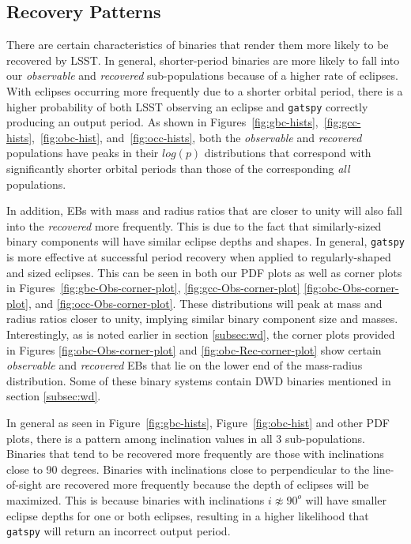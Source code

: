 \documentclass[twocolumn]{aastex63}
\begin{document}
\subsection{Recovery Patterns}
\label{subsec:recovery-patterns}
There are certain characteristics of binaries that render them more likely to be recovered by LSST. In general, shorter-period binaries are more likely to fall into our \textit{observable} and \textit{recovered} sub-populations because of a higher rate of eclipses. With eclipses occurring more frequently due to a shorter orbital period, there is a higher probability of both LSST observing an eclipse and \texttt{gatspy} correctly producing an output period. As shown in Figures~\ref{fig:gbc-hists},~\ref{fig:gcc-hists},~\ref{fig:obc-hist}, and~\ref{fig:occ-hists}, both the \textit{observable} and \textit{recovered} populations have peaks in their $log(p)$ distributions that correspond with significantly shorter orbital periods than those of the corresponding \textit{all} populations.

In addition, EBs with mass and radius ratios that are closer to unity will also fall into the \textit{recovered} more frequently. This is due to the fact that similarly-sized binary components will have similar eclipse depths and shapes. In general, \texttt{gatspy} is more effective at successful period recovery when applied to regularly-shaped and sized eclipses. This can be seen in both our PDF plots as well as corner plots in Figures~\ref{fig:gbc-Obs-corner-plot}, \ref{fig:gcc-Obs-corner-plot} \ref{fig:obc-Obs-corner-plot}, and \ref{fig:occ-Obs-corner-plot}. These distributions will peak at mass and radius ratios closer to unity, implying similar binary component size and masses. Interestingly, as is noted earlier in section \ref{subsec:wd}, the corner plots provided in Figures \ref{fig:obc-Obs-corner-plot} and \ref{fig:obc-Rec-corner-plot} show certain \textit{observable} and \textit{recovered} EBs that lie on the lower end of the mass-radius distribution. Some of these binary systems contain DWD binaries mentioned in section \ref{subsec:wd}.

In general as seen in Figure~\ref{fig:gbc-hists}, Figure~\ref{fig:obc-hist} and other PDF plots, there is a pattern among inclination values in all 3 sub-populations. Binaries that tend to be recovered more frequently are those with inclinations close to 90 degrees. Binaries with inclinations close to perpendicular to the line-of-sight are recovered more frequently because the depth of eclipses will be maximized. This is because binaries with inclinations $i \not\approx 90^o$ will have smaller eclipse depths for one or both eclipses, resulting in a higher likelihood that \texttt{gatspy} will return an incorrect output period.
\end{document}
